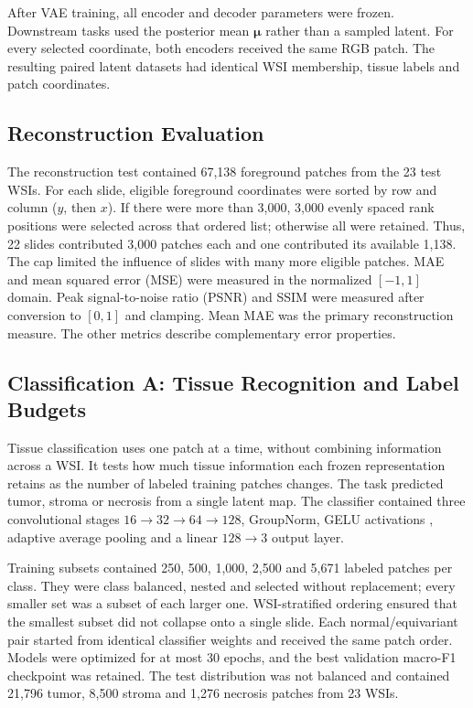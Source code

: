 \documentclass{midl}
\begin{document}
After VAE training, all encoder and decoder parameters were frozen. Downstream tasks used the posterior mean $\boldsymbol{\mu}$ rather than a sampled latent. For every selected coordinate, both encoders received the same RGB patch. The resulting paired latent datasets had identical WSI membership, tissue labels and patch coordinates.

\subsection{Reconstruction Evaluation}

The reconstruction test contained 67,138 foreground patches from the 23 test WSIs. For each slide, eligible foreground coordinates were sorted by row and column ($y$, then $x$). If there were more than 3,000, 3,000 evenly spaced rank positions were selected across that ordered list; otherwise all were retained. Thus, 22 slides contributed 3,000 patches each and one contributed its available 1,138. The cap limited the influence of slides with many more eligible patches. MAE and mean squared error (MSE) were measured in the normalized $[-1,1]$ domain. Peak signal-to-noise ratio (PSNR) and SSIM were measured after conversion to $[0,1]$ and clamping. Mean MAE was the primary reconstruction measure. The other metrics describe complementary error properties.

\subsection{Classification A: Tissue Recognition and Label Budgets}

Tissue classification uses one patch at a time, without combining information across a WSI. It tests how much tissue information each frozen representation retains as the number of labeled training patches changes. The task predicted tumor, stroma or necrosis from a single latent map. The classifier contained three convolutional stages $16\rightarrow32\rightarrow64\rightarrow128$, GroupNorm, GELU activations \cite{hendrycks_gelu_2016}, adaptive average pooling and a linear $128\rightarrow3$ output layer.

Training subsets contained 250, 500, 1,000, 2,500 and 5,671 labeled patches per class. They were class balanced, nested and selected without replacement; every smaller set was a subset of each larger one. WSI-stratified ordering ensured that the smallest subset did not collapse onto a single slide. Each normal/equivariant pair started from identical classifier weights and received the same patch order. Models were optimized for at most 30 epochs, and the best validation macro-F1 checkpoint was retained. The test distribution was not balanced and contained 21,796 tumor, 8,500 stroma and 1,276 necrosis patches from 23 WSIs.
\end{document}
